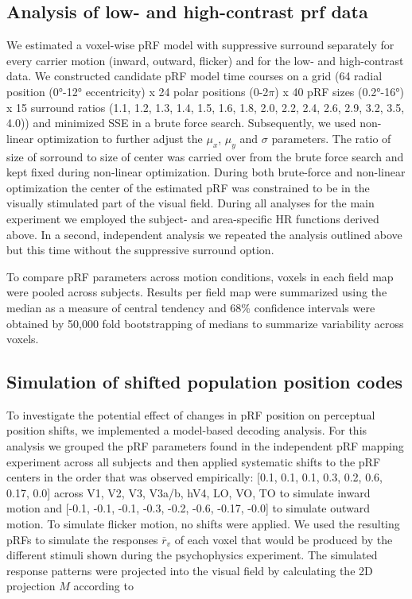 \subsection{Analysis of low- and high-contrast prf data}
We estimated a voxel-wise pRF model with suppressive surround separately for every carrier motion (inward, outward, flicker) and for the low- and high-contrast data. We constructed candidate pRF model time courses on a grid (64 radial position (0°-12° eccentricity) x 24 polar positions (0-2$\pi$) x 40 pRF sizes (0.2°-16°) x 15 surround ratios (1.1, 1.2, 1.3, 1.4, 1.5, 1.6, 1.8, 2.0, 2.2, 2.4, 2.6, 2.9, 3.2, 3.5, 4.0)) and minimized SSE in a brute force search. Subsequently, we used non-linear optimization to further adjust the $\mu_x$, $\mu_y$ and $\sigma$ parameters. The ratio of size of sorround to size of center was carried over from the brute force search and kept fixed during non-linear optimization. During both brute-force and non-linear optimization the center of the estimated pRF was constrained to be in the visually stimulated part of the visual field. During all analyses for the main experiment we employed the subject- and area-specific HR functions derived above. In a second, independent analysis we repeated the analysis outlined above but this time without the suppressive surround option.

To compare pRF parameters across motion conditions, voxels in each field map were pooled across subjects. Results per field map were summarized using the median as a measure of central tendency and 68\% confidence intervals were obtained by 50,000 fold bootstrapping of medians to summarize variability across voxels.

\subsection{Simulation of shifted population position codes}
To investigate the potential effect of changes in pRF position on perceptual position shifts, we implemented a model-based decoding analysis. For this analysis we grouped the pRF parameters found in the independent pRF mapping experiment across all subjects and then applied systematic shifts to the pRF centers in the order that was observed empirically: [0.1, 0.1, 0.1, 0.3, 0.2, 0.6, 0.17, 0.0] across V1, V2, V3, V3a/b, hV4, LO, VO, TO to simulate inward motion and [-0.1, -0.1, -0.1, -0.3, -0.2, -0.6, -0.17, -0.0] to simulate outward motion. To simulate flicker motion, no shifts were applied. We used the resulting pRFs to simulate the responses $\overline{r}_v$ of each voxel that would be produced by the different stimuli shown during the psychophysics experiment. The simulated response patterns were projected into the visual field by calculating the 2D projection $M$ according to

